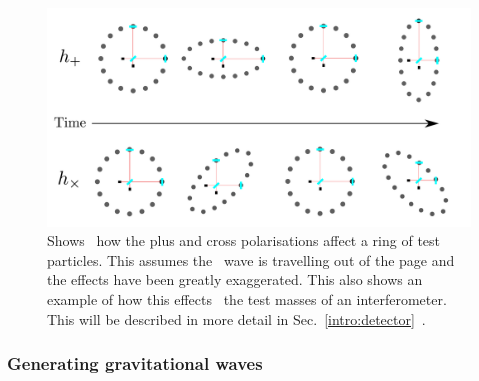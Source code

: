 \begin{figure}[h]
    \centering
    \includegraphics[width=\textwidth]{C1_intro/polarisation_ring.pdf}
 \caption[Plus and Cross polarisations]{Shows~ how the plus and cross
polarisations affect a ring of test particles. This assumes
the~ wave is travelling out of the page and the effects
have been greatly exaggerated. This also shows an example of how this
effects~ the test masses of an interferometer.  This will be
described in more detail in Sec.~\ref{intro:detector}~.}
\label{gw:polarisations}
\end{figure}



\subsubsection{Generating gravitational waves}

